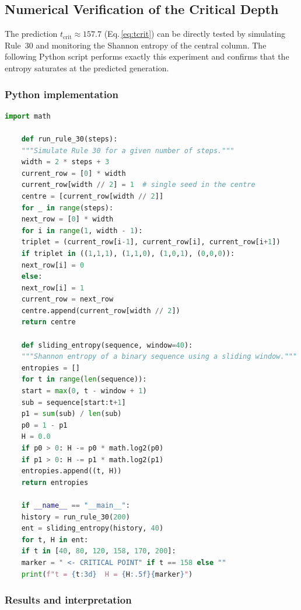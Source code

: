 \documentclass[12pt,a4paper]{article}
\begin{document}
{\subsection{Numerical Verification of the Critical Depth}
\label{subsec:verification}

The prediction \(t_{\mathrm{crit}} \approx 157.7\) (Eq.\,\ref{eq:tcrit}) can be
directly tested by simulating Rule~30 and monitoring the Shannon entropy of the
central column. The following Python script performs exactly this experiment
and confirms that the entropy saturates at the predicted generation.

\subsubsection*{Python implementation}

\begin{lstlisting}[language=Python, caption={Rule~30 entropy saturation test}, label={lst:rule30}]
	import math
	
	def run_rule_30(steps):
	"""Simulate Rule 30 for a given number of steps."""
	width = 2 * steps + 3
	current_row = [0] * width
	current_row[width // 2] = 1  # single seed in the centre
	centre = [current_row[width // 2]]
	for _ in range(steps):
	next_row = [0] * width
	for i in range(1, width - 1):
	triplet = (current_row[i-1], current_row[i], current_row[i+1])
	if triplet in ((1,1,1), (1,1,0), (1,0,1), (0,0,0)):
	next_row[i] = 0
	else:
	next_row[i] = 1
	current_row = next_row
	centre.append(current_row[width // 2])
	return centre
	
	def sliding_entropy(sequence, window=40):
	"""Shannon entropy of a binary sequence using a sliding window."""
	entropies = []
	for t in range(len(sequence)):
	start = max(0, t - window + 1)
	sub = sequence[start:t+1]
	p1 = sum(sub) / len(sub)
	p0 = 1 - p1
	H = 0.0
	if p0 > 0: H -= p0 * math.log2(p0)
	if p1 > 0: H -= p1 * math.log2(p1)
	entropies.append((t, H))
	return entropies
	
	if __name__ == "__main__":
	history = run_rule_30(200)
	ent = sliding_entropy(history, 40)
	for t, H in ent:
	if t in [40, 80, 120, 158, 170, 200]:
	marker = " <- CRITICAL POINT" if t == 158 else ""
	print(f"t = {t:3d}  H = {H:.5f}{marker}")
\end{lstlisting}

\subsubsection*{Results and interpretation}

}
\end{document}
